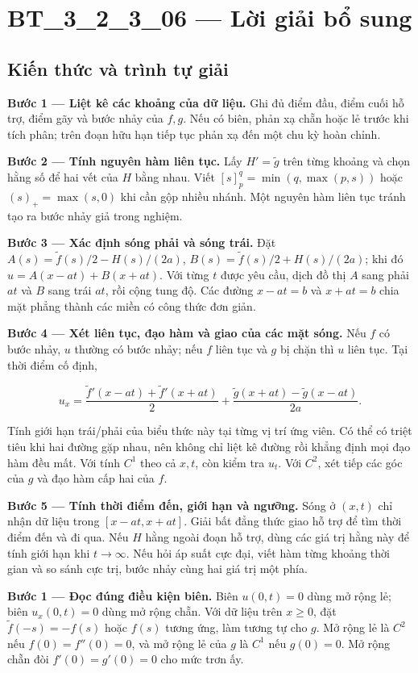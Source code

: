 \documentclass[10pt,a4paper]{article}
\begin{document}
\section*{BT\_3\_2\_3\_06 — Lời giải bổ sung}
\subsection*{Kiến thức và trình tự giải}
\textbf{Bước 1 — Liệt kê các khoảng của dữ liệu.} Ghi đủ điểm đầu, điểm cuối hỗ trợ, điểm gãy và bước nhảy của $f,g$. Nếu có biên, phản xạ chẵn hoặc lẻ trước khi tích phân; trên đoạn hữu hạn tiếp tục phản xạ đến một chu kỳ hoàn chỉnh.

\textbf{Bước 2 — Tính nguyên hàm liên tục.} Lấy $H'=\widetilde g$ trên từng khoảng và chọn hằng số để hai vết của $H$ bằng nhau. Viết $[s]_p^q=\min(q,\max(p,s))$ hoặc $(s)_+=\max(s,0)$ khi cần gộp nhiều nhánh. Một nguyên hàm liên tục tránh tạo ra bước nhảy giả trong nghiệm.

\textbf{Bước 3 — Xác định sóng phải và sóng trái.} Đặt $A(s)=\widetilde f(s)/2-H(s)/(2a)$, $B(s)=\widetilde f(s)/2+H(s)/(2a)$; khi đó $u=A(x-at)+B(x+at)$. Với từng $t$ được yêu cầu, dịch đồ thị $A$ sang phải $at$ và $B$ sang trái $at$, rồi cộng tung độ. Các đường $x-at=b$ và $x+at=b$ chia mặt phẳng thành các miền có công thức đơn giản.

\textbf{Bước 4 — Xét liên tục, đạo hàm và giao của các mặt sóng.} Nếu $f$ có bước nhảy, $u$ thường có bước nhảy; nếu $f$ liên tục và $g$ bị chặn thì $u$ liên tục. Tại thời điểm cố định,


\[
u_x=\frac{\widetilde f'(x-at)+\widetilde f'(x+at)}2+\frac{\widetilde g(x+at)-\widetilde g(x-at)}{2a}.
\]


Tính giới hạn trái/phải của biểu thức này tại từng vị trí ứng viên. Có thể có triệt tiêu khi hai đường gặp nhau, nên không chỉ liệt kê đường rồi khẳng định mọi đạo hàm đều mất. Với tính $C^1$ theo cả $x,t$, còn kiểm tra $u_t$. Với $C^2$, xét tiếp các góc của $g$ và đạo hàm cấp hai của $f$.

\textbf{Bước 5 — Tính thời điểm đến, giới hạn và ngưỡng.} Sóng ở $(x,t)$ chỉ nhận dữ liệu trong $[x-at,x+at]$. Giải bất đẳng thức giao hỗ trợ để tìm thời điểm đến và đi qua. Nếu $H$ hằng ngoài đoạn hỗ trợ, dùng các giá trị hằng này để tính giới hạn khi $t\to\infty$. Nếu hỏi áp suất cực đại, viết hàm từng khoảng thời gian và so sánh cực trị, bước nhảy cùng hai giá trị một phía.

\textbf{Bước 1 — Đọc đúng điều kiện biên.} Biên $u(0,t)=0$ dùng mở rộng lẻ; biên $u_x(0,t)=0$ dùng mở rộng chẵn. Với dữ liệu trên $x\ge0$, đặt $\widetilde f(-s)=-f(s)$ hoặc $f(s)$ tương ứng, làm tương tự cho $g$. Mở rộng lẻ là $C^2$ nếu $f(0)=f''(0)=0$, và mở rộng lẻ của $g$ là $C^1$ nếu $g(0)=0$. Mở rộng chẵn đòi $f'(0)=g'(0)=0$ cho mức trơn ấy.
\end{document}
